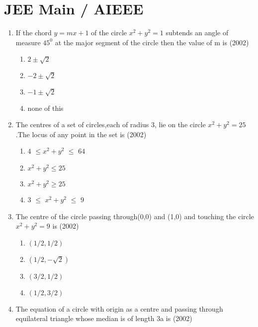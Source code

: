 \documentclass[journal,12pt,twocolumn]{IEEEtran}
\theoremstyle{remark}
\begin{document}
\section{JEE Main / AIEEE}
\begin{enumerate} 
\item If the chord $y=mx+1$ of the circle $x^2+y^2=1$ subtends an angle of measure $45^0$ at the major segment of the circle then the value of m is \hfill{(2002)}\\
\begin{enumerate}
\item$2\pm\sqrt{2}$\\
\item$-2\pm\sqrt{2}$\\
\item$-1\pm\sqrt{2}$\\
\item none of this\\
\end{enumerate}
\item The centres of a set of circles,each of radius $3$, lie on the circle $x^2+y^2=25$.The locus of any point in the set is \hfill{(2002)}\\
\begin{enumerate}
\item$4$ $\leq$$x^2+y^2$ $\leq$ $64$\\
\item$x^2+y^2\leq25$\\
\item$x^2+y^2\geq25$\\
\item$3$ $\leq$ $x^2+y^2$ $\leq$ $9$\\
\end{enumerate}
\item The centre of the circle passing through(0,0) and (1,0) and touching the circle $x^2+y^2=9$ is \hfill{(2002)}\\
\begin{enumerate}
\item$(1/2,1/2)$\\
\item$(1/2,-\sqrt{2})$\\
\item$(3/2,1/2)$\\
\item$(1/2,3/2)$\\
\end{enumerate}
\item The equation of a circle with origin as a centre and passing through equilateral triangle whose median is of length 3a is \hfill{(2002)}\\

\end{enumerate}
\end{document}

